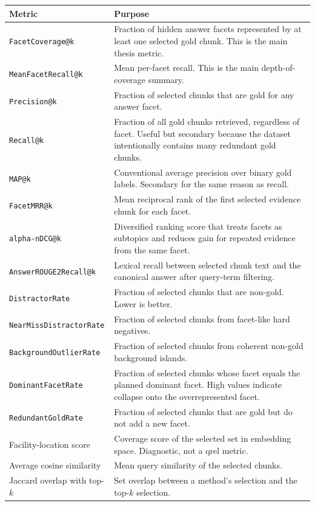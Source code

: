 \documentclass[11pt,a4paper]{article}
\newcommand{\field}[1]{\texttt{#1}}
\begin{document}
\begingroup
\renewcommand{\arraystretch}{1.25}
\begin{center}
	\begin{tabular}{@{}p{4cm}p{10.4cm}@{}}
		\toprule
		\textbf{Metric} & \textbf{Purpose} \\
		\midrule
		\field{FacetCoverage@k} & Fraction of hidden answer facets represented by at least one selected gold chunk. This is the main thesis metric. \\
		\field{MeanFacetRecall@k} & Mean per-facet recall. This is the main depth-of-coverage summary. \\
		\field{Precision@k} & Fraction of selected chunks that are gold for any answer facet. \\
		\field{Recall@k} & Fraction of all gold chunks retrieved, regardless of facet. Useful but secondary because the dataset intentionally contains many redundant gold chunks. \\
		\field{MAP@k} & Conventional average precision over binary gold labels. Secondary for the same reason as recall. \\
		\field{FacetMRR@k} & Mean reciprocal rank of the first selected evidence chunk for each facet. \\
		\field{alpha-nDCG@k} & Diversified ranking score that treats facets as subtopics and reduces gain for repeated evidence from the same facet. \\
		\field{AnswerROUGE2Recall@k} & Lexical recall between selected chunk text and the canonical answer after query-term filtering. \\
		\field{DistractorRate} & Fraction of selected chunks that are non-gold. Lower is better. \\
		\field{NearMissDistractorRate} & Fraction of selected chunks from facet-like hard negatives. \\
		\field{BackgroundOutlierRate} & Fraction of selected chunks from coherent non-gold background islands. \\
		\field{DominantFacetRate} & Fraction of selected chunks whose facet equals the planned dominant facet. High values indicate collapse onto the overrepresented facet. \\
		\field{RedundantGoldRate} & Fraction of selected chunks that are gold but do not add a new facet. \\
		Facility-location score & Coverage score of the selected set in embedding space. Diagnostic, not a qrel metric. \\
		Average cosine similarity & Mean query similarity of the selected chunks. \\
		Jaccard overlap with top-$k$ & Set overlap between a method's selection and the top-$k$ selection. \\
		\bottomrule
	\end{tabular}
\end{center}
\endgroup
\end{document}
